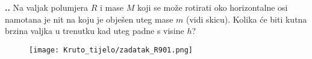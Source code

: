 

\noindent 
\textbf{
\thecjelina.\thezadatak.}
Na valjak polumjera $R$ i mase $M$ koji se može rotirati oko horizontalne osi namotana je nit na koju je obje\v{s}en uteg mase
$m$ (vidi skicu). Kolika će biti kutna brzina valjka u trenutku kad uteg padne s visine $h$?
\begin{figure}[h]%
  \begin{center}
    \texttt{[image: Kruto\_tijelo/zadatak\_R901.png]}
  \end{center}
\end{figure}


